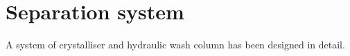 \section*{Separation system}

A system of crystalliser and hydraulic wash column has been designed in detail. 